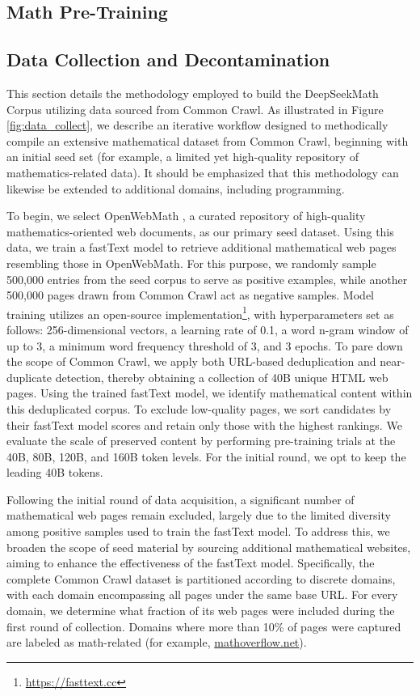 \begin{itemize}[topsep=0pt]
\section{Math Pre-Training}

\subsection{Data Collection and Decontamination} This section details the methodology employed to build the DeepSeekMath Corpus utilizing data sourced from Common Crawl. As illustrated in Figure \ref{fig:data_collect}, we describe an iterative workflow designed to methodically compile an extensive mathematical dataset from Common Crawl, beginning with an initial seed set (for example, a limited yet high-quality repository of mathematics-related data). It should be emphasized that this methodology can likewise be extended to additional domains, including programming.

To begin, we select OpenWebMath \citep{openwebmath}, a curated repository of high-quality mathematics-oriented web documents, as our primary seed dataset. Using this data, we train a fastText model \citep{joulin2016fasttext} to retrieve additional mathematical web pages resembling those in OpenWebMath. For this purpose, we randomly sample 500,000 entries from the seed corpus to serve as positive examples, while another 500,000 pages drawn from Common Crawl act as negative samples. Model training utilizes an open-source implementation\footnote{\url{https://fasttext.cc}}, with hyperparameters set as follows: 256-dimensional vectors, a learning rate of 0.1, a word n-gram window of up to 3, a minimum word frequency threshold of 3, and 3 epochs. To pare down the scope of Common Crawl, we apply both URL-based deduplication and near-duplicate detection, thereby obtaining a collection of 40B unique HTML web pages. Using the trained fastText model, we identify mathematical content within this deduplicated corpus. To exclude low-quality pages, we sort candidates by their fastText model scores and retain only those with the highest rankings. We evaluate the scale of preserved content by performing pre-training trials at the 40B, 80B, 120B, and 160B token levels. For the initial round, we opt to keep the leading 40B tokens.

Following the initial round of data acquisition, a significant number of mathematical web pages remain excluded, largely due to the limited diversity among positive samples used to train the fastText model. To address this, we broaden the scope of seed material by sourcing additional mathematical websites, aiming to enhance the effectiveness of the fastText model. Specifically, the complete Common Crawl dataset is partitioned according to discrete domains, with each domain encompassing all pages under the same base URL. For every domain, we determine what fraction of its web pages were included during the first round of collection. Domains where more than 10\% of pages were captured are labeled as math-related (for example, \url{mathoverflow.net}). 


\end{itemize}
